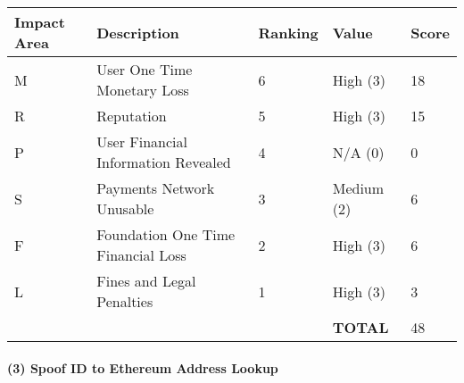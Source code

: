\documentclass[12pt]{article} %
\begin{document}
{\begin{center}
\begin{tabular}{ | l | l | l | l | l |}
  \hline
  \textbf{Impact Area} & \textbf{Description} & \textbf{Ranking} & \textbf{Value} & \textbf{Score}
  \\ \hline
  M & User One Time Monetary Loss			& 6	& High (3)		& 18
  \\ \hline
  R & Reputation		& 5	& High (3)		& 15
  \\ \hline
  P & User Financial Information Revealed		& 4	& N/A (0)		& 0
  \\ \hline
  S & Payments Network Unusable					& 3	& Medium (2)	& 6
  \\ \hline
  F & Foundation One Time Financial Loss	& 2	& High (3)		& 6
  \\ \hline
  L & Fines and Legal Penalties						& 1	& High (3)		& 3
  \\ \hline
  & & & \textbf{TOTAL} & 48
  \\ \hline
\end{tabular}
\end{center}
\label{tab:severityProgrammingErrorInContract}

\paragraph{(3) Spoof ID to Ethereum Address Lookup }

}
\end{document}

